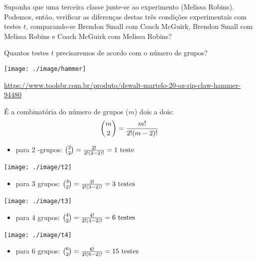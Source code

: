 \documentclass[]{article}
\providecommand{\tightlist}{%
  \setlength{\itemsep}{0pt}\setlength{\parskip}{0pt}}
\begin{document}
Suponha que uma terceira classe junte-se ao experimento (Melissa
Robins). Podemos, então, verificar as diferenças destas três condições
experimentais com testes \(t\), comparando-se Brendon Small com Coach
McGuirk, Brendon Small com Melissa Robins e Coach McGuirk com Melissa
Robins?

 Quantos testes \(t\) precisaremos de acordo com o número de grupos?

\begin{center}\texttt{[image: ./image/hammer]} \end{center}

\url{https://www.toolsbr.com.br/produto/dewalt-martelo-20-oz-rip-claw-hammer-94480}

É a combinatória do número de grupos (\(m\)) dois a dois:
\[{m \choose 2} = { {m!} \over {2! (m-2)!} }\]

\begin{itemize}
\tightlist
\item
  para 2 -grupos:
  \({2 \choose 2} = { {2!} \over {2! (2-2)!} } = 1~\text{teste}\)
\end{itemize}

\begin{center}\texttt{[image: ./image/t2]} \end{center}

\begin{itemize}
\tightlist
\item
  para 3 grupos:
  \({3 \choose 2} = { {3!} \over {2! (3-2)!} } = 3~\text{testes}\)
\end{itemize}

\begin{center}\texttt{[image: ./image/t3]} \end{center}

\begin{itemize}
\tightlist
\item
  para 4 grupos:
  \({4 \choose 2} = { {4!} \over {2! (4-2)!} } = 6~\text{testes}\)
\end{itemize}

\begin{center}\texttt{[image: ./image/t4]} \end{center}

\begin{itemize}
\tightlist
\item
  para 6 grupos:
  \({6 \choose 2} = { {6!} \over {2! (6-2)!} } = 15~\text{testes}\)
\end{itemize}
\end{document}
